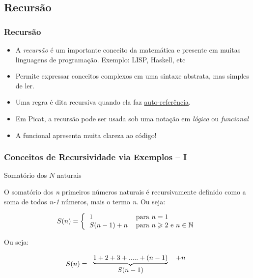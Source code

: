 \subsection{Recursão}
\begin{frame}[fragile]

\frametitle{Recursão}

\begin{itemize}

    \item A \textit{recursão} é um importante conceito da matemática e presente em muitas  linguagens
    de programação. Exemplo: LISP, Haskell, etc

    \pause
    \item Permite expressar conceitos complexos em uma sintaxe abstrata, mas  simples de ler.
    \pause
    \item Uma regra é dita recursiva quando ela faz \underline{auto-referência}.
    
    \pause
    \item Em Picat, a recursão pode ser usada sob uma notação em \textit{lógica} ou \textit{funcional}
    
    \pause
    \item A funcional apresenta muita clareza ao código!
\end{itemize}

  
\end{frame}


\begin{frame}[fragile]

\frametitle{Conceitos de Recursividade via Exemplos -- I}

\begin{block}{Somatório dos $N$ naturais}

 O somatório dos \emph{n}  primeiros  números naturais é recursivamente 
 definido como a soma de todos \emph{n-1} números, mais o termo \emph{n}. 
 Ou seja:

    \[
    S(n)=\left \{
    \begin{tabular}
        [c]{ll}
        $1$ & para $n=1$ \\
        $S(n-1) + n $ & para $n \geqslant 2$ e $n \in \mathbb{N}$
    \end{tabular}
    \right.
    \]
    
    Ou seja:
    
    \[
    S(n)=
    \begin{tabular}[c]{cc}
        $\underbrace{1+2+3+.....+(n-1)}$ &  $  + n$\\
        $S(n-1)$ &
    \end{tabular}
    \]
\end{block}            

\end{frame}

